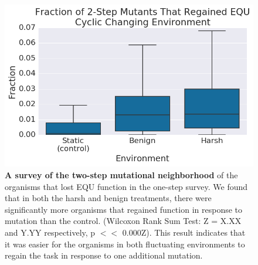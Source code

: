 \documentclass[letterpaper]{article}
\begin{document}
\begin{figure}[h!] %
\begin{center}
\includegraphics[trim={0.2cm 0 0.4cm 0.25cm},clip,width=1\columnwidth]{figures/CCE_frac_2step__box.png}
\caption{\textbf{A survey of the two-step mutational neighborhood} of the organisms that lost EQU function in the one-step survey. We found that in both the harsh and benign treatments, there were significantly more organisms that regained function in response to mutation than the control. (Wilcoxon Rank Sum Test: Z = X.XX and Y.YY respectively, p $<<$ 0.000Z). This result indicates that it was easier for the organisms in both fluctuating environments to regain the task in response to one additional mutation.
}\label{fig:CCE_two_step}
\end{center}
\end{figure}
\end{document}
